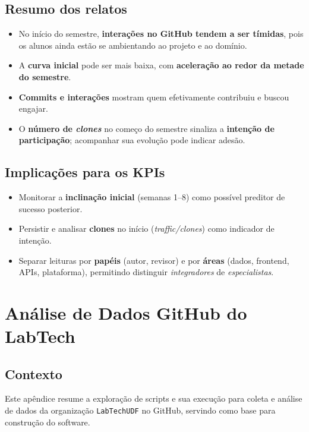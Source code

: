 \documentclass[
	12pt,
	openright,
	oneside,
	a4paper,
	brazil
]{abntex2}
\begin{document}
\begin{apendicesenv}
\section*{Resumo dos relatos}
\begin{itemize}
\item No início do semestre, \textbf{interações no GitHub tendem a ser tímidas}, pois os alunos ainda estão se ambientando ao projeto e ao domínio.
\item A \textbf{curva inicial} pode ser mais baixa, com \textbf{aceleração ao redor da metade do semestre}.
\item \textbf{Commits e interações} mostram quem efetivamente contribuiu e buscou engajar.
\item O \textbf{número de \textit{clones}} no começo do semestre sinaliza a \textbf{intenção de participação}; acompanhar sua evolução pode indicar adesão.
\end{itemize}

\section*{Implicações para os KPIs}
\begin{itemize}
\item Monitorar a \textbf{inclinação inicial} (semanas 1--8) como possível preditor de sucesso posterior.
\item Persistir e analisar \textbf{clones} no início (\emph{traffic/clones}) como indicador de intenção.
\item Separar leituras por \textbf{papéis} (autor, revisor) e por \textbf{áreas} (dados, frontend, APIs, plataforma), permitindo distinguir \textit{integradores} de \textit{especialistas}.
\end{itemize}


\chapter{Análise de Dados GitHub do LabTech}
\label{apendiceC}

\section*{Contexto}
Este apêndice resume a exploração de scripts e sua execução para coleta e análise de dados da organização \texttt{LabTechUDF} no GitHub, servindo como base para construção do software.


\end{apendicesenv}
\end{document}
